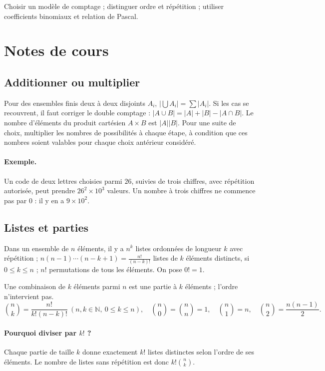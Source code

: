 \label{ch:9}


\begin{keypoint}[Objectifs]Choisir un modèle de comptage ; distinguer ordre et répétition ; utiliser coefficients binomiaux et relation de Pascal.\end{keypoint}

\section{Notes de cours}
\subsection{Additionner ou multiplier}
Pour des ensembles finis deux à deux disjoints $A_i$, $|\bigcup A_i|=\sum|A_i|$. Si les cas se recouvrent, il faut corriger le double comptage : $|A\cup B|=|A|+|B|-|A\cap B|$.
Le nombre d'éléments du produit cartésien $A\times B$ est $|A||B|$. Pour une suite de choix, multiplier les nombres de possibilités à chaque étape, à condition que ces nombres soient valables pour chaque choix antérieur considéré.
\paragraph{Exemple.} Un code de deux lettres choisies parmi $26$, suivies de trois chiffres, avec répétition autorisée, peut prendre $26^2\times10^3$ valeurs. Un nombre à trois chiffres ne commence pas par $0$ : il y en a $9\times10^2$.
\subsection{Listes et parties}
Dans un ensemble de $n$ éléments, il y a $n^k$ listes ordonnées de longueur $k$ avec répétition ; $n(n-1)\cdots(n-k+1)=\frac{n!}{(n-k)!}$ listes de $k$ éléments distincts, si $0\le k\le n$ ; $n!$ permutations de tous les éléments. On pose $0!=1$.
\begin{keypoint}[Combinaisons]
Une combinaison de $k$ éléments parmi $n$ est une partie à $k$ éléments ; l'ordre n'intervient pas.
\[\binom nk=\frac{n!}{k!(n-k)!}\ (n,k\in\mathbb N,\ 0\le k\le n),\quad\binom n0=\binom nn=1,\quad\binom n1=n,\quad\binom n2=\frac{n(n-1)}2.\]
\end{keypoint}
\paragraph{Pourquoi diviser par $k!$ ?} Chaque partie de taille $k$ donne exactement $k!$ listes distinctes selon l'ordre de ses éléments. Le nombre de listes sans répétition est donc $k!\binom nk$.
